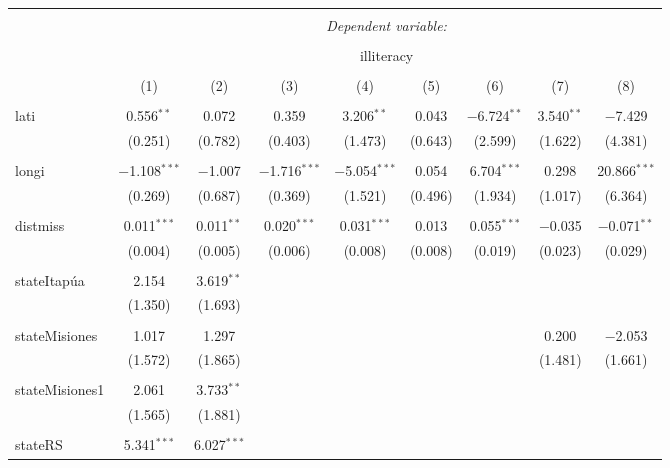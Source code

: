 \documentclass[
  a4paper,
]{article}
\begin{document}
\begin{table}[!htbp] \centering 
  \caption{} 
  \label{} 
\begin{tabular}{@{\extracolsep{5pt}}lcccccccc} 
\\[-1.8ex]\hline 
\hline \\[-1.8ex] 
 & \multicolumn{8}{c}{\textit{Dependent variable:}} \\ 
\cline{2-9} 
\\[-1.8ex] & \multicolumn{8}{c}{illiteracy} \\ 
\\[-1.8ex] & (1) & (2) & (3) & (4) & (5) & (6) & (7) & (8)\\ 
\hline \\[-1.8ex] 
 lati & 0.556$^{**}$ & 0.072 & 0.359 & 3.206$^{**}$ & 0.043 & $-$6.724$^{**}$ & 3.540$^{**}$ & $-$7.429 \\ 
  & (0.251) & (0.782) & (0.403) & (1.473) & (0.643) & (2.599) & (1.622) & (4.381) \\ 
  & & & & & & & & \\ 
 longi & $-$1.108$^{***}$ & $-$1.007 & $-$1.716$^{***}$ & $-$5.054$^{***}$ & 0.054 & 6.704$^{***}$ & 0.298 & 20.866$^{***}$ \\ 
  & (0.269) & (0.687) & (0.369) & (1.521) & (0.496) & (1.934) & (1.017) & (6.364) \\ 
  & & & & & & & & \\ 
 distmiss & 0.011$^{***}$ & 0.011$^{**}$ & 0.020$^{***}$ & 0.031$^{***}$ & 0.013 & 0.055$^{***}$ & $-$0.035 & $-$0.071$^{**}$ \\ 
  & (0.004) & (0.005) & (0.006) & (0.008) & (0.008) & (0.019) & (0.023) & (0.029) \\ 
  & & & & & & & & \\ 
 stateItapúa & 2.154 & 3.619$^{**}$ &  &  &  &  &  &  \\ 
  & (1.350) & (1.693) &  &  &  &  &  &  \\ 
  & & & & & & & & \\ 
 stateMisiones & 1.017 & 1.297 &  &  &  &  & 0.200 & $-$2.053 \\ 
  & (1.572) & (1.865) &  &  &  &  & (1.481) & (1.661) \\ 
  & & & & & & & & \\ 
 stateMisiones1 & 2.061 & 3.733$^{**}$ &  &  &  &  &  &  \\ 
  & (1.565) & (1.881) &  &  &  &  &  &  \\ 
  & & & & & & & & \\ 
 stateRS & 5.341$^{***}$ & 6.027$^{***}$ &  &  &  &  &  &  \\ 

\end{tabular}
\end{table}
\end{document}
